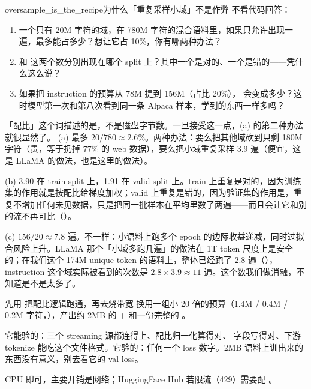 \begin{checkpoint}{oversample_is_the_recipe}{为什么「重复采样小域」不是作弊}
不看代码回答：
\begin{enumerate}[label=(\alph*)]
  \item 一个只有 20M 字符的域，在 780M 字符的混合语料里，如果只允许出现一遍，最多能占多少？想让它占 10\%，你有哪两种办法？
  \item {} 和  这两个数分别出现在哪个 split 上？其中一个是对的、一个是错的——凭什么这么说？
  \item 如果把 instruction 的预算从 78M 提到 156M（占比 20\%）， 会变成多少？这时模型第一次和第八次看到同一条 Alpaca 样本，学到的东西一样多吗？
\end{enumerate}
\hint 「配比」这个词描述的是，不是磁盘字节数。一旦接受这一点，(a) 的第二种办法就很显然了。
\ifshowanswers
\tcblower
\answer (a) 最多 $20/780 \approx 2.6\%$。两种办法：要么把其他域砍到只剩 180M 字符（贵，等于扔掉 77\% 的 web 数据），要么把小域重复采样 3.9 遍（便宜，这是 LLaMA 的做法，也是这里的做法）。

(b) 3.90 在 train split 上，1.91 在 valid split 上。train 上重复是对的，因为训练集的作用就是按配比给梯度加权；valid 上重复是错的，因为验证集的作用是，重复不增加任何未见数据，只是把同一批样本在平均里数了两遍——而且会让它和别的流不再可比（）。

(c) $156/20 \approx 7.8$ 遍。不一样：小语料上跑多个 epoch 的边际收益递减，同时过拟合风险上升。LLaMA 那个「小域多跑几遍」的做法在 1T token 尺度上是安全的；在我们这个 174M unique token 的语料上，整体已经跑了 2.8 遍（），instruction 这个域实际被看到的次数是 $2.8 \times 3.9 \approx 11$ 遍。这个数我们做消融，不知道是不是太多了。
\whereincode {}
\fi
\end{checkpoint}

\begin{tipbox}{先用  把配比逻辑跑通，再去烧带宽}
 换用一组小 20 倍的预算（1.4M / 0.4M / 0.2M 字符，），产出约 2MB 的  +  和一份完整的 。

它能验的：三个 streaming 源都连得上、配比归一化算得对、 字段写得对、下游 tokenize 能吃这个文件格式。它验的：任何一个 loss 数字。2MB 语料上训出来的东西没有意义，别去看它的 val loss。

\resources CPU 即可，主要开销是网络；HuggingFace Hub 若限流（429）需要配 。
\end{tipbox}

